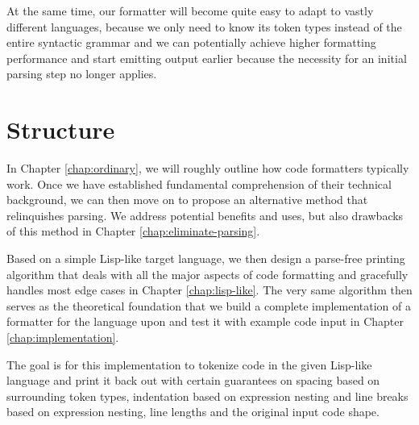 At the same time, our formatter will become quite easy to adapt to vastly different languages,
because we only need to know its token types instead of the entire syntactic grammar and
we can potentially achieve higher formatting performance and start emitting output earlier
because the necessity for an initial parsing step no longer applies.

\section{Structure}
In Chapter \ref{chap:ordinary}, we will roughly outline how code formatters typically work.
Once we have established fundamental comprehension of their technical background,
we can then move on to propose an alternative method that relinquishes parsing.
We address potential benefits and uses,
but also drawbacks of this method in Chapter \ref{chap:eliminate-parsing}.

Based on a simple Lisp-like target language,
we then design a parse-free printing algorithm
that deals with all the major aspects of code formatting
and gracefully handles most edge cases
in Chapter \ref{chap:lisp-like}.
The very same algorithm then serves as the theoretical foundation
that we build a complete implementation of a formatter
for the language upon and test it with example code input
in Chapter \ref{chap:implementation}.

The goal is for this implementation to tokenize code in the given Lisp-like language
and print it back out with certain guarantees on
spacing based on surrounding token types,
indentation based on expression nesting and
line breaks based on expression nesting, line lengths and the original input code shape.
